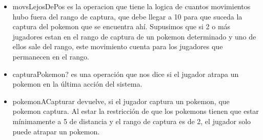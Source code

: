 \begin{itemize}
\item movsLejosDePos es la operacion que tiene la logica de cuantos movimientos hubo fuera del rango de captura, que debe llegar a 10 para que suceda la captura del pokemon que se encuentra ah\'i. Supusimos que si 2 o m\'as jugadores estan en el rango de captura de un pokemon determinado y uno de ellos sale del rango, este movimiento cuenta para los jugadores que permanecen en el rango.

\item capturaPokemon? es una operaci\'on que nos dice si el jugador atrapa un pokemon en la \'ultima acci\'on del sistema.

\item pokemonACapturar devuelve, si el jugador captura un pokemon, que pokemon captura. Al estar la restricci\'on de que los pokemons tienen que estar m\'inimamente a 5 de distancia y el rango de captura es de 2, el jugador solo puede atrapar un pokemon.

\end{itemize}